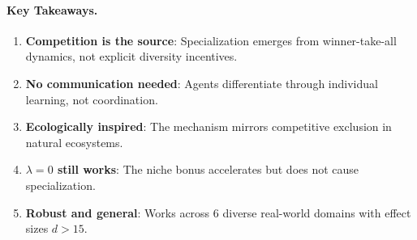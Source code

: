 \paragraph{Key Takeaways.}
\begin{enumerate}
    \item \textbf{Competition is the source}: Specialization emerges from winner-take-all dynamics, not explicit diversity incentives.
    \item \textbf{No communication needed}: Agents differentiate through individual learning, not coordination.
    \item \textbf{Ecologically inspired}: The mechanism mirrors competitive exclusion in natural ecosystems.
    \item \textbf{$\lambda = 0$ still works}: The niche bonus accelerates but does not cause specialization.
    \item \textbf{Robust and general}: Works across 6 diverse real-world domains with effect sizes $d > 15$.
\end{enumerate}
